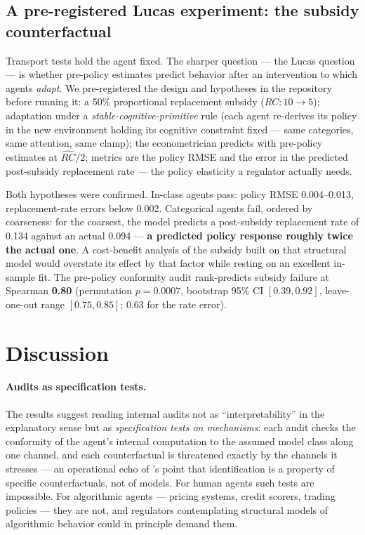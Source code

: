 \documentclass[11pt]{article}
\newcommand{\rhat}{\widehat{RC}}
\begin{document}
\subsection{A pre-registered Lucas experiment: the subsidy counterfactual}
\label{sec:subsidy}
Transport tests hold the agent fixed. The sharper question --- the Lucas
question --- is whether pre-policy estimates predict behavior after an
intervention to which agents \emph{adapt}. We pre-registered the design and
hypotheses in the repository before running it: a 50\% proportional
replacement subsidy ($RC\!: 10 \to 5$); adaptation under a
\emph{stable-cognitive-primitive} rule (each agent re-derives its policy in
the new environment holding its cognitive constraint fixed --- same
categories, same attention, same clamp); the econometrician predicts with
pre-policy estimates at $\rhat/2$; metrics are the policy RMSE and the error
in the predicted post-subsidy replacement rate --- the policy elasticity a
regulator actually needs.

Both hypotheses were confirmed. In-class agents pass: policy RMSE
0.004--0.013, replacement-rate errors below 0.002. Categorical agents fail,
ordered by coarseness: for the coarsest, the model predicts a post-subsidy
replacement rate of 0.134 against an actual 0.094 --- \textbf{a predicted
policy response roughly twice the actual one}. A cost-benefit analysis of
the subsidy built on that structural model would overstate its effect by
that factor while resting on an excellent in-sample fit. The pre-policy
conformity audit rank-predicts subsidy failure at Spearman \textbf{0.80}
(permutation $p = 0.0007$, bootstrap 95\% CI $[0.39, 0.92]$, leave-one-out
range $[0.75, 0.85]$; 0.63 for the rate error).

\section{Discussion}\label{sec:discussion}

\paragraph{Audits as specification tests.} The results suggest reading
internal audits not as ``interpretability'' in the explanatory sense but as
\emph{specification tests on mechanisms}: each audit checks the conformity
of the agent's internal computation to the assumed model class along one
channel, and each counterfactual is threatened exactly by the channels it
stresses --- an operational echo of \citet{kalouptsidi2021}'s point that
identification is a property of specific counterfactuals, not of models.
For human agents such tests are impossible. For algorithmic agents ---
pricing systems, credit scorers, trading policies --- they are not, and
regulators contemplating structural models of algorithmic behavior could in
principle demand them.
\end{document}
